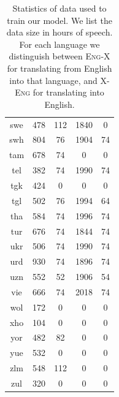 \begin{table}[!htb]
\begin{minipage}[t]{0.45\textwidth}
\begin{tabular}{@{}ccccc@{}}
        swe & 478 & 112 & 1840 & 0 \\
        swh & 804 & 76 & 1904 & 74 \\
        tam & 678 & 74 & 0 & 0 \\
        tel & 382 & 74 & 1990 & 74 \\
        tgk & 424 & 0 & 0 & 0 \\
        tgl & 502 & 76 & 1994 & 64 \\
        tha & 584 & 74 & 1996 & 74 \\
        tur & 676 & 74 & 1844 & 74 \\
        ukr & 506 & 74 & 1990 & 74 \\
        urd & 930 & 74 & 1896 & 74 \\
        uzn & 552 & 52 & 1906 & 54 \\
        vie & 666 & 74 & 2018 & 74 \\
        wol & 172 & 0 & 0 & 0 \\
        xho & 104 & 0 & 0 & 0 \\
        yor & 482 & 82 & 0 & 0 \\
        yue & 532 & 0 & 0 & 0 \\
        zlm & 548 & 112 & 0 & 0 \\
        zul & 320 & 0 & 0 & 0 \\
        \bottomrule
    \end{tabular}
    \end{minipage}
    \caption{\small Statistics of \sst{} data used to train our \mfourt{} model. We list the data size in hours of speech. For each language we distinguish between \textsc{Eng-X} for translating from English into that language, and \textsc{X-Eng} for translating into English.
}
\label{tbl:offline:s2stdata}
\end{table}
